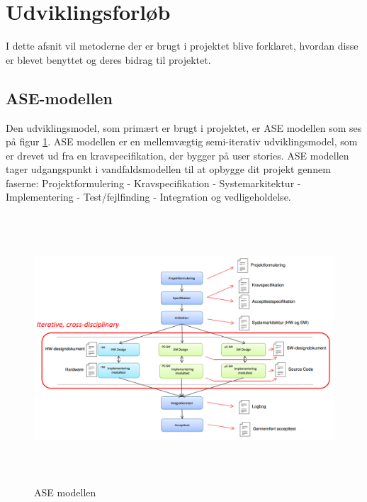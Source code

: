 \section{Udviklingsforløb}
I dette afsnit vil metoderne der er brugt i projektet blive forklaret, hvordan disse er blevet benyttet og deres bidrag til projektet.

\subsection{ASE-modellen} \label{sec:ASEModel}
Den udviklingsmodel, som primært er brugt i projektet, er ASE modellen som ses på figur \ref{fig:ASE}. ASE modellen \cite{ASE} er en mellemvægtig semi-iterativ udviklingsmodel, som er drevet ud fra en kravspecifikation, der bygger på user stories. ASE modellen tager udgangspunkt i vandfaldsmodellen til at opbygge dit projekt gennem faserne: Projektformulering - Kravspecifikation - Systemarkitektur -  Implementering -  Test/fejlfinding -  Integration og vedligeholdelse.

\begin{figure} [H]
	\begin{center}
		\includegraphics[height=10cm, width=12cm]{Udviklingsforlob/ASEModellen}
	\end{center}
	\caption{ASE modellen}
	\label{fig:ASE}
\end{figure}

